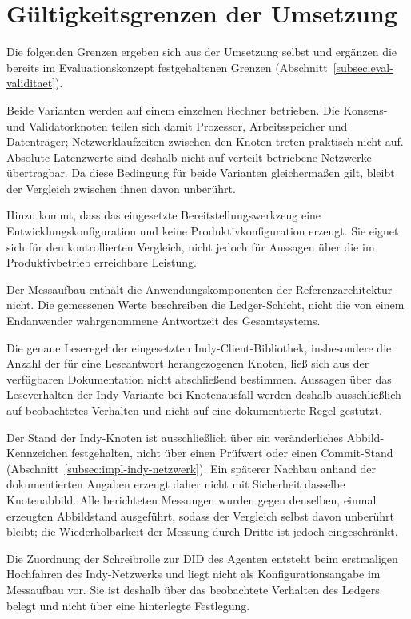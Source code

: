 \section{Gültigkeitsgrenzen der Umsetzung}
\label{sec:impl-grenzen}

Die folgenden Grenzen ergeben sich aus der Umsetzung selbst und ergänzen die bereits im Evaluationskonzept festgehaltenen Grenzen (Abschnitt~\ref{subsec:eval-validitaet}).

Beide Varianten werden auf einem einzelnen Rechner betrieben. Die Konsens- und Validatorknoten teilen sich damit Prozessor, Arbeitsspeicher und Datenträger; Netzwerklaufzeiten zwischen den Knoten treten praktisch nicht auf. Absolute Latenzwerte sind deshalb nicht auf verteilt betriebene Netzwerke übertragbar. Da diese Bedingung für beide Varianten gleichermaßen gilt, bleibt der Vergleich zwischen ihnen davon unberührt.

Hinzu kommt, dass das eingesetzte Bereitstellungswerkzeug eine Entwicklungskonfiguration und keine Produktivkonfiguration erzeugt. Sie eignet sich für den kontrollierten Vergleich, nicht jedoch für Aussagen über die im Produktivbetrieb erreichbare Leistung.

Der Messaufbau enthält die Anwendungskomponenten der Referenzarchitektur nicht. Die gemessenen Werte beschreiben die Ledger-Schicht, nicht die von einem Endanwender wahrgenommene Antwortzeit des Gesamtsystems.

Die genaue Leseregel der eingesetzten Indy-Client-Bibliothek, insbesondere die Anzahl der für eine Leseantwort herangezogenen Knoten, ließ sich aus der verfügbaren Dokumentation nicht abschließend bestimmen. Aussagen über das Leseverhalten der Indy-Variante bei Knotenausfall werden deshalb ausschließlich auf beobachtetes Verhalten und nicht auf eine dokumentierte Regel gestützt.

Der Stand der Indy-Knoten ist ausschließlich über ein veränderliches Abbild-Kennzeichen festgehalten, nicht über einen Prüfwert oder einen Commit-Stand (Abschnitt~\ref{subsec:impl-indy-netzwerk}). Ein späterer Nachbau anhand der dokumentierten Angaben erzeugt daher nicht mit Sicherheit dasselbe Knotenabbild. Alle berichteten Messungen wurden gegen denselben, einmal erzeugten Abbildstand ausgeführt, sodass der Vergleich selbst davon unberührt bleibt; die Wiederholbarkeit der Messung durch Dritte ist jedoch eingeschränkt.

Die Zuordnung der Schreibrolle zur DID des Agenten entsteht beim erstmaligen Hochfahren des Indy-Netzwerks und liegt nicht als Konfigurationsangabe im Messaufbau vor. Sie ist deshalb über das beobachtete Verhalten des Ledgers belegt und nicht über eine hinterlegte Festlegung.

